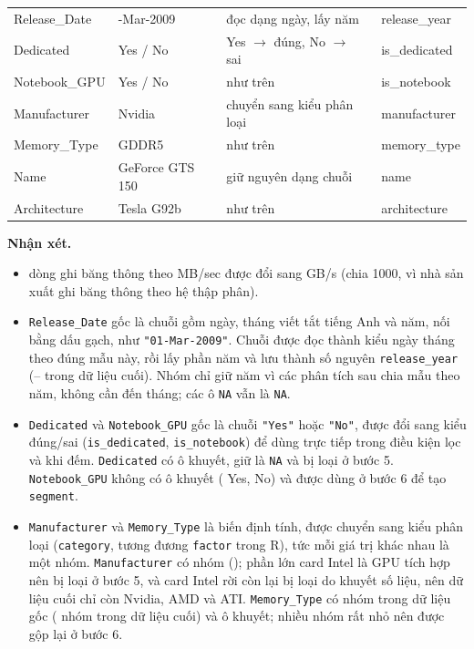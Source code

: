 \begin{table}[H]
\begin{tabularx}{\linewidth}{>{\ttfamily}l >{\ttfamily}l
      >{\raggedright\arraybackslash}X >{\ttfamily\raggedright\arraybackslash}l}
    Release\_Date & 01-Mar-2009 & đọc dạng ngày, lấy năm & release\_year \\
    Dedicated & Yes / No & Yes $\to$ đúng, No $\to$ sai & is\_dedicated \\
    Notebook\_GPU & Yes / No & như trên & is\_notebook \\
    Manufacturer & Nvidia & chuyển sang kiểu phân loại & manufacturer \\
    Memory\_Type & GDDR5 & như trên & memory\_type \\
    Name & GeForce GTS 150 & giữ nguyên dạng chuỗi & name \\
    Architecture & Tesla G92b & như trên & architecture \\
    \bottomrule
  \end{tabularx}
\end{table}

{\sloppy\textbf{Nhận xét.}
\begin{itemize}
  \item \PreBandwidthInMb{} dòng ghi băng thông theo MB/sec được đổi sang GB/s (chia 1000,
    vì nhà sản xuất ghi băng thông theo hệ thập phân).
  \item \texttt{Release\_Date} gốc là chuỗi gồm ngày, tháng viết tắt tiếng Anh và năm, nối
    bằng dấu gạch, như \verb|"01-Mar-2009"|. Chuỗi được đọc thành kiểu ngày tháng theo
    đúng mẫu này, rồi lấy phần năm và lưu thành số nguyên \texttt{release\_year}
    (\PreReleaseYearMin--\PreReleaseYearMax{} trong dữ liệu cuối). Nhóm chỉ giữ năm vì các
    phân tích sau chia mẫu theo năm, không cần đến tháng; các ô \texttt{NA} vẫn là
    \texttt{NA}.
  \item \texttt{Dedicated} và \texttt{Notebook\_GPU} gốc là chuỗi \verb|"Yes"| hoặc
    \verb|"No"|, được đổi sang kiểu đúng/sai (\texttt{is\_dedicated},
    \texttt{is\_notebook}) để dùng trực tiếp trong điều kiện lọc và khi đếm.
    \texttt{Dedicated} có \PreUnknownDedicated{} ô khuyết, giữ là \texttt{NA} và bị loại
    ở bước 5. \texttt{Notebook\_GPU} không có ô khuyết (\PreNotebookYes{} Yes,
    \PreNotebookNo{} No) và được dùng ở bước 6 để tạo \texttt{segment}.
  \item \texttt{Manufacturer} và \texttt{Memory\_Type} là biến định tính, được chuyển sang
    kiểu phân loại (\texttt{category}, tương đương \texttt{factor} trong R), tức mỗi giá
    trị khác nhau là một nhóm. \texttt{Manufacturer} có \PreManufacturerLevels{} nhóm
    (\PreManufacturerNames); phần lớn card Intel là GPU tích hợp nên bị loại ở bước 5, và \PreIntelCards{} card
    Intel rời còn lại bị loại do khuyết số liệu, nên
    dữ liệu cuối chỉ còn Nvidia, AMD và ATI.
    \texttt{Memory\_Type} có \PreMemoryTypeLevels{} nhóm trong dữ liệu gốc
    (\PreMemoryTypeLevelsFinal{} nhóm trong dữ liệu cuối) và \PreMemoryTypeMissing{} ô
    khuyết; nhiều nhóm rất nhỏ nên được gộp lại ở bước 6.
\end{itemize}
\par}


